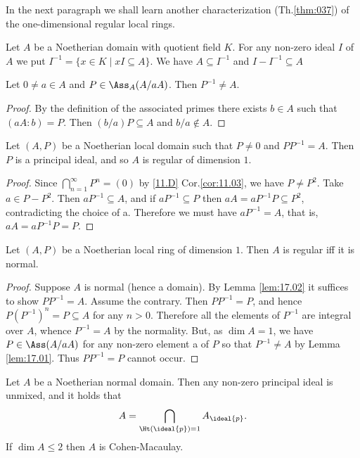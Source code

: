 \documentclass[../main]{subfiles}
\begin{document}
In the next paragraph we shall learn another characterization (Th.\ref{thm:037}) of the one-dimensional regular local rings.

\newparagraph Let $A$ be a Noetherian domain with quotient field $K$. For any non-zero ideal $I$ of $A$ we put $I^{-1}=\{x \in K \mid x I \subseteq A\}$. We have $A \subseteq I^{-1}$ and $I-I^{-1} \subseteq A$

\begin{lemma}\label{lem:17.01}
Let $0 \neq a \in A$ and $P \in \Ass_A(A/aA)$. Then $P^{-1} \neq A$.
\end{lemma} 
\begin{proof}
By the definition of the associated primes there exists $b \in A$ such that $(a A: b)=P$. Then $(b / a) P \subseteq A$ and $b/a \notin A$.
\end{proof}

\begin{lemma}\label{lem:17.02}
Let $(A, P)$ be a Noetherian local domain such that $P \neq 0$ and $P P^{-1}=A$. Then $P$ is a principal ideal, and so $A$ is regular of dimension $1$.
\end{lemma} 
\begin{proof}
Since $\bigcap_{n=1}^{\infty} P^n=(0)$ by \ref{11.D} Cor.\ref{cor:11.03}, we have $P \neq P^2$. Take \newline $a\in P-P^2$. Then $aP^{-1} \subseteq A$, and if $aP^{-1} \subseteq P$ then $aA=a P^{-1} P \subseteq P^2$, contradicting the choice of a. Therefore we must have $aP^{-1}=A$, that is, \newline $aA=aP^{-1} P=P$.
\end{proof}

\begin{theorem}\label{thm:037}
   Let $(A, P)$ be a Noetherian local ring of dimension $1$. Then $A$ is regular iff it is normal.
\end{theorem}
\begin{proof}
Suppose $A$ is normal (hence a domain). By Lemma \ref{lem:17.02} it suffices to show $PP^{-1}=A$. Assume the contrary. Then $PP^{-1}=P$, and hence\newline $P(P^{-1})^n=P \subseteq A$ for any $n>0$. Therefore all the elements of $P^{-1}$ are integral over $A$, whence $P^{-1}=A$ by the normality. But, as $\dim A=1$, we have $P \in \Ass(A / aA)$ for any non-zero element a of $P$ so that $P^{-1} \neq A$ by Lemma \ref{lem:17.01}. Thus $PP^{-1}=P$ cannot occur.
\end{proof}

\begin{theorem}\label{thm:038}
   Let $A$ be a Noetherian normal domain. Then any non-zero principal ideal is unmixed, and it holds that \[A=\bigcap_{\Ht(\ideal{p})=1} A_{\ideal{p}}.\] If $\dim A \leqslant 2$ then $A$ is Cohen-Macaulay.
\end{theorem}
\end{document}
